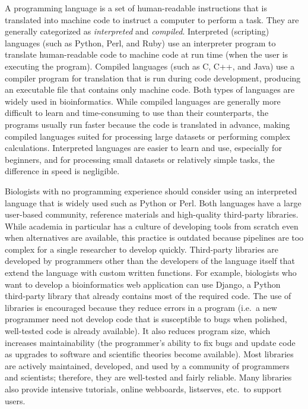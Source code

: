 \documentclass[ChapterTOCs,krantz2]{krantz} %
\begin{document}
A programming language is a set of human-readable instructions that is translated into
machine code to instruct a computer to perform a task.
They are generally categorized as \emph{interpreted} and \emph{compiled}.
Interpreted (scripting) languages (such as Python, Perl, and Ruby) use an
interpreter program to translate human-readable
code to machine code at run time (when the user is executing the
program). Compiled languages (such as C, C++, and Java)
use a compiler program for translation that is run 
during code development, producing an executable file that
contains only machine code. Both types of languages are widely used in
bioinformatics. While compiled languages are generally more difficult to learn
and time-consuming to use than their counterparts, the 
programs usually run faster because the code is translated in advance,
making compiled languages suited for processing large
datasets or performing complex calculations. Interpreted languages are
easier to learn and use, especially for beginners, and for processing 
small datasets or relatively simple
tasks, the difference in speed is negligible. 

Biologists with no programming experience should consider using an interpreted
language that is widely used such as Python or Perl.
Both languages have a large user-based community, reference materials and
high-quality third-party libraries.
While academia in particular has a culture of 
developing tools from scratch even when alternatives are available, this practice
is outdated because pipelines are too complex for a single
researcher to develop quickly. Third-party libraries are developed 
by programmers other than the developers of the language itself that extend the language
with custom written functions.  For example,   
biologists who want to develop a bioinformatics web application 
can use Django, a Python third-party library that already contains most of the required 
code.  The use of libraries is encouraged because they
reduce errors in a program (i.e.\ a new programmer need not 
develop code that is susceptible to bugs when
polished, well-tested code is already available). It also reduces program size, 
which increases maintainability (the programmer's ability to fix 
bugs and update code as upgrades to software and scientific theories
become available).
Most libraries are actively maintained, developed, and used
by a community of programmers and scientists; therefore, they are well-tested
and fairly reliable. Many libraries also provide intensive tutorials, online
webboards, listserves, etc.\ to support users. 
\end{document}

